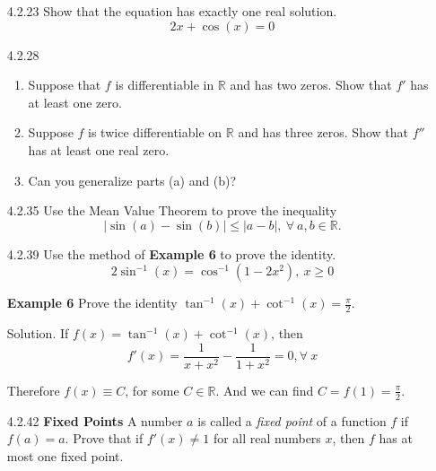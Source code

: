 \documentclass{article}
\begin{document}
\begin{enumerate}
\item[4.2.23]
    Show that the equation has exactly one real solution.
    \[
        2x + \cos (x) = 0
    \]

\vspace{5cm}

\item[4.2.28]
    \begin{enumerate}
        \item
            Suppose that $f$ is differentiable in $\mathbb{R}$ and has two zeros.
            Show that $f'$ has at least one zero.
        \item
            Suppose $f$ is twice differentiable on $\mathbb{R}$ and
            has three zeros. Show that $f''$ has at least one
            real zero.
        \item
            Can you generalize parts (a) and (b)?
    \end{enumerate}

\vspace{6cm}

\item[4.2.35]
    Use the Mean Value Theorem to prove the inequality
    \[
        | \sin (a) - \sin (b) | \leqslant | a - b |,\ \forall\ a, b \in \mathbb{R}.
    \]

\newpage

\item[4.2.39]
    Use the method of \textbf{Example 6} to prove the identity.
    \[
        2 \sin^{-1} (x) = \cos^{-1} (1 - 2x^{2}),\ x \geqslant 0
    \]

    \begin{tcolorbox}
        \textbf{Example 6} Prove the identity $ \displaystyle  \tan^{-1} (x) + \cot^{-1} (x) = \frac{\pi}{2}$.

        Solution. If $f(x) = \tan^{-1} (x) + \cot^{-1} (x)$, then
        \[
            f'(x) = \frac{1}{x+x^{2}} - \frac{1}{1+x^{2}} = 0, \forall\ x
        \]

        Therefore $f(x)  \equiv C$, for some $C \in \mathbb{R}$. And we can find $C = f(1) = \frac{\pi}{2}$.
    \end{tcolorbox}

\vspace{8cm}

\item[4.2.42]
    \textbf{Fixed Points} A number $a$ is called a \textit{fixed point}
    of a function $f$ if $f(a)=a$. Prove that if $f'(x) \neq 1$
    for all real numbers $x$, then $f$ has at most one
    fixed point.


\end{enumerate}
\end{document}
